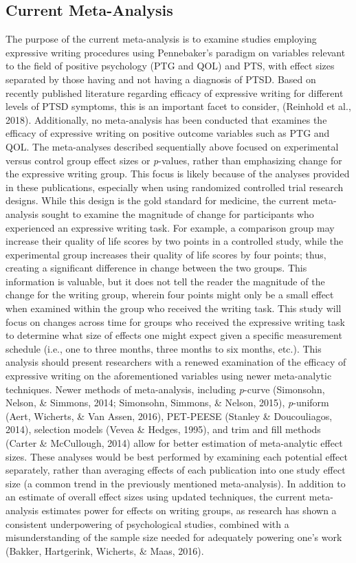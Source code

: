 \documentclass[english,man, mask]{apa6}
\theoremstyle{definition}
\theoremstyle{definition}
\theoremstyle{definition}
\theoremstyle{remark}
\begin{document}
\subsection{Current Meta-Analysis}\label{current-meta-analysis}

The purpose of the current meta-analysis is to examine studies employing
expressive writing procedures using Pennebaker's paradigm on variables
relevant to the field of positive psychology (PTG and QOL) and PTS, with
effect sizes separated by those having and not having a diagnosis of
PTSD. Based on recently published literature regarding efficacy of
expressive writing for different levels of PTSD symptoms, this is an
important facet to consider, (Reinhold et al., 2018). Additionally, no
meta-analysis has been conducted that examines the efficacy of
expressive writing on positive outcome variables such as PTG and QOL.
The meta-analyses described sequentially above focused on experimental
versus control group effect sizes or \emph{p}-values, rather than
emphasizing change for the expressive writing group. This focus is
likely because of the analyses provided in these publications,
especially when using randomized controlled trial research designs.
While this design is the gold standard for medicine, the current
meta-analysis sought to examine the magnitude of change for participants
who experienced an expressive writing task. For example, a comparison
group may increase their quality of life scores by two points in a
controlled study, while the experimental group increases their quality
of life scores by four points; thus, creating a significant difference
in change between the two groups. This information is valuable, but it
does not tell the reader the magnitude of the change for the writing
group, wherein four points might only be a small effect when examined
within the group who received the writing task. This study will focus on
changes across time for groups who received the expressive writing task
to determine what size of effects one might expect given a specific
measurement schedule (i.e., one to three months, three months to six
months, etc.). This analysis should present researchers with a renewed
examination of the efficacy of expressive writing on the aforementioned
variables using newer meta-analytic techniques. Newer methods of
meta-analysis, including \emph{p}-curve (Simonsohn, Nelson, \& Simmons,
2014; Simonsohn, Simmons, \& Nelson, 2015), \emph{p}-uniform (Aert,
Wicherts, \& Van Assen, 2016), PET-PEESE (Stanley \& Doucouliagos,
2014), selection models (Vevea \& Hedges, 1995), and trim and fill
methods (Carter \& McCullough, 2014) allow for better estimation of
meta-analytic effect sizes. These analyses would be best performed by
examining each potential effect separately, rather than averaging
effects of each publication into one study effect size (a common trend
in the previously mentioned meta-analysis). In addition to an estimate
of overall effect sizes using updated techniques, the current
meta-analysis estimates power for effects on writing groups, as research
has shown a consistent underpowering of psychological studies, combined
with a misunderstanding of the sample size needed for adequately
powering one's work (Bakker, Hartgerink, Wicherts, \& Maas, 2016).
\end{document}
